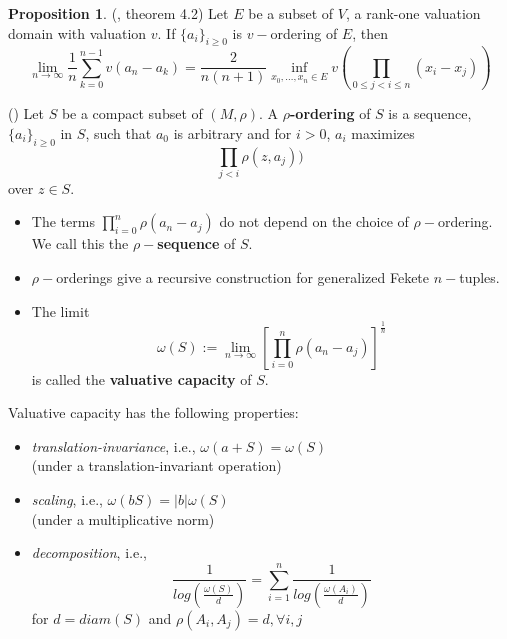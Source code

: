 \documentclass{beamer}
\theoremstyle{definition}
\newtheorem*{proposition*}{Proposition}
\begin{document}
\begin{frame}
\begin{proposition*}
	(\cite{jlc}, theorem 4.2)	Let $E$ be a subset of $V$, a rank-one valuation domain with valuation $v$. If $\{a_i\}_{i \geq 0}$ is $v-$ordering of $E$, then
	\[\lim_{n\to\infty} \frac{1}{n} \sum_{k=0}^{n-1} v(a_n-a_k) =\frac{2}{n(n+1)} \inf_{x_0, \ldots, x_n \in E} v (\prod_{0\leq j < i \leq n} (x_i-x_j))\]
\end{proposition*}
\end{frame}

\begin{frame}
	\begin{definition}
		(\cite{kj}) Let $S$ be a compact subset of $(M,\rho)$. A \textbf{$\rho$-ordering} of $S$ is a sequence, $\{a_i\}_{i\geq 0}$ in $S$, such that $a_0$ is arbitrary and for $i >0$, $a_i$ maximizes 
		\[ \prod_{j < i} \rho(z, a_j) )\] over $z \in S$.\\
	\end{definition}
	\pause
    \begin{itemize}
	   \item The terms $\prod_{i=0}^n \rho(a_n - a_j)$ do not depend on the choice of $\rho-$ordering. We call this the \textbf{$\rho-$sequence} of $S$. \\
	\end{itemize}
\end{frame}

\begin{frame}
	\begin{itemize}
		\item $\rho-$orderings give a recursive construction for generalized Fekete $n-$tuples.\\	
		\pause	
		\item The limit \[ \omega(S):= \lim_{n\to\infty} [\prod_{i=0}^n \rho(a_n - a_j)]^{\frac{1}{n}}\] is called the \textbf{valuative capacity} of $S$.
	\end{itemize}		  
\end{frame}

\begin{frame}
Valuative capacity has the following properties:
\begin{itemize}
	\item \textit{translation-invariance}, i.e., $\omega(a+S) = \omega(S)$\\ (under a translation-invariant operation)
	\pause
	\item \textit{scaling}, i.e., $\omega(bS) = \lvert b\rvert \omega(S)$\\ (under a multiplicative norm)
	\pause
	\item \textit{decomposition}, i.e., \[\frac{1}{log(\frac{\omega(S)}{d}) } = \sum_{i=1}^n \frac{1}{log(\frac{\omega(A_i)}{d})}\]
	for $d=diam(S)$ and $\rho(A_i, A_j)=d, \forall i,j$ 
\end{itemize}	
\end{frame}
\end{document}
